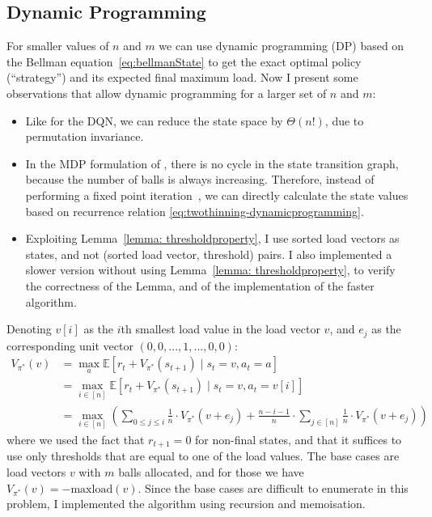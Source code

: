 \subsection{Dynamic Programming}


For smaller values of $n$ and $m$ we can use dynamic programming (DP) based on the Bellman equation~\ref{eq:bellmanState} to get the exact optimal policy (``\DP strategy'') and its expected final maximum load. Now I present some observations that allow dynamic programming for a larger set of $n$ and $m$:


\begin{itemize}
    \item 
    Like for the DQN, we can reduce the state space by $\Theta(n!)$, due to permutation invariance.
    \item
    In the MDP formulation of \TwoThinning, there is no cycle in the state transition graph, because the number of balls is always increasing. Therefore, instead of performing a fixed point iteration~\cite{rhoades1991fixedpointiteration}, we can directly calculate the state values based on recurrence relation \ref{eq:twothinning-dynamicprogramming}.
    \item
    Exploiting Lemma~\ref{lemma: thresholdproperty}, I use sorted load vectors as states, and not (sorted load vector, threshold) pairs. I also implemented a slower version without using Lemma~\ref{lemma: thresholdproperty}, to verify the correctness of the Lemma, and of the implementation of the faster algorithm.
\end{itemize}


Denoting $v[i]$ as the $i$th smallest load value in the load vector $v$, and $e_j$ as the corresponding unit vector $(0, 0, ... , 1, ..., 0, 0)$: 
\begin{equation} \label{eq:twothinning-dynamicprogramming}
\begin{split}
    V_{\pi^*}(v) &= \max_a \mathbb{E} [r_t + V_{\pi^*}(s_{t+1}) \mid s_t=v, a_t=a] \\
    &= \max_{i \in [n]} \mathbb{E} [r_t + V_{\pi^*}(s_{t+1}) \mid s_t=v, a_t=v[i]] \\
    &= \max_{i \in [n]} \left(\sum_{0\leq j \leq i} \frac{1}{n}\cdot V_{\pi^*}(v+e_j) + \frac{n-i-1}{n} \cdot  \sum_{j \in [n]} \frac{1}{n}\cdot V_{\pi^*}(v+e_j) \right)
\end{split}
\end{equation}
where we used the fact that $r_{t+1}=0$ for non-final states, and that it suffices to use only thresholds that are equal to one of the load values. The base cases are load vectors $v$ with $m$ balls allocated, and for those we have $V_{\pi^*}(v)=-\mathrm{maxload}(v)$. Since the base cases are difficult to enumerate in this problem, I implemented the algorithm using recursion and memoisation. 



